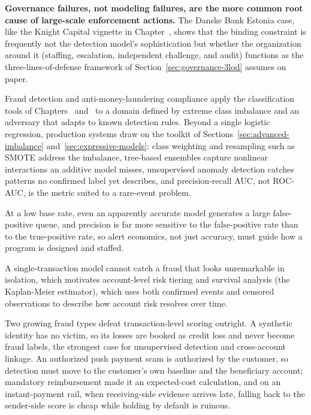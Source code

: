 \documentclass[../ai_in_finance]{subfiles}
\begin{document}
\textbf{Governance failures, not modeling failures, are the more common root cause of large-scale enforcement actions.} The Danske Bank Estonia case, like the Knight Capital vignette in Chapter~, shows that the binding constraint is frequently not the detection model's sophistication but whether the organization around it (staffing, escalation, independent challenge, and audit) functions as the three-lines-of-defense framework of Section~\ref{sec:governance-3lod} assumes on paper.


Fraud detection and anti-money-laundering compliance apply the classification tools of Chapters~ and~ to a domain defined by extreme class imbalance and an adversary that adapts to known detection rules. Beyond a single logistic regression, production systems draw on the toolkit of Sections~\ref{sec:advanced-imbalance} and~\ref{sec:expressive-models}: class weighting and resampling such as SMOTE address the imbalance, tree-based ensembles capture nonlinear interactions an additive model misses, unsupervised anomaly detection catches patterns no confirmed label yet describes, and precision-recall AUC, not ROC-AUC, is the metric suited to a rare-event problem.

At a low base rate, even an apparently accurate model generates a large false-positive queue, and precision is far more sensitive to the false-positive rate than to the true-positive rate, so alert economics, not just accuracy, must guide how a program is designed and staffed.

A single-transaction model cannot catch a fraud that looks unremarkable in isolation, which motivates account-level risk tiering and survival analysis (the Kaplan-Meier estimator), which uses both confirmed events and censored observations to describe how account risk resolves over time.

Two growing fraud types defeat transaction-level scoring outright. A synthetic identity has no victim, so its losses are booked as credit loss and never become fraud labels, the strongest case for unsupervised detection and cross-account linkage. An authorized push payment scam is authorized by the customer, so detection must move to the customer's own baseline and the beneficiary account; mandatory reimbursement made it an expected-cost calculation, and on an instant-payment rail, when receiving-side evidence arrives late, falling back to the sender-side score is cheap while holding by default is ruinous.
\end{document}
